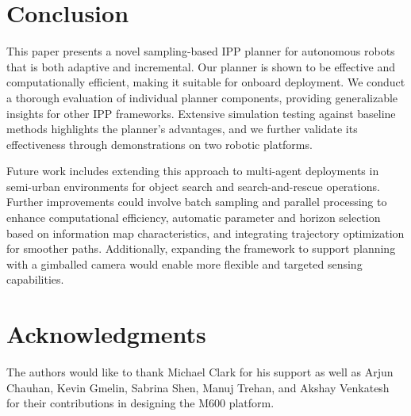 
\section{Conclusion}\label{sec:conclusion}
This paper presents a novel sampling-based IPP planner for autonomous robots that is both adaptive and incremental. Our planner is shown to be effective and computationally efficient, making it suitable for onboard deployment. We conduct a thorough evaluation of individual planner components, providing generalizable insights for other IPP frameworks. Extensive simulation testing against baseline methods highlights the planner’s advantages, and we further validate its effectiveness through demonstrations on two robotic platforms.


Future work includes extending this approach to multi-agent deployments in semi-urban environments for object search and search-and-rescue operations. Further improvements could involve batch sampling and parallel processing to enhance computational efficiency, automatic parameter and horizon selection based on information map characteristics, and integrating trajectory optimization for smoother paths. Additionally, expanding the framework to support planning with a gimballed camera would enable more flexible and targeted sensing capabilities.

\balance



\section*{Acknowledgments}
The authors would like to thank Michael Clark for his support as well as Arjun Chauhan, Kevin Gmelin, Sabrina
Shen, Manuj Trehan, and Akshay Venkatesh for their contributions in designing the M600 platform.

